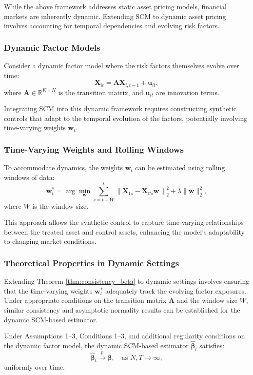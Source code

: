 While the above framework addresses static asset pricing models, financial markets are inherently dynamic. Extending SCM to dynamic asset pricing involves accounting for temporal dependencies and evolving risk factors.

\subsubsection{Dynamic Factor Models}

Consider a dynamic factor model where the risk factors themselves evolve over time:
\[
\mathbf{X}_{it} = \mathbf{A} \mathbf{X}_{i,t-1} + \mathbf{u}_{it},
\]
where $\mathbf{A} \in \mathbb{R}^{K \times K}$ is the transition matrix, and $\mathbf{u}_{it}$ are innovation terms.

Integrating SCM into this dynamic framework requires constructing synthetic controls that adapt to the temporal evolution of the factors, potentially involving time-varying weights $\mathbf{w}_t$.

\subsubsection{Time-Varying Weights and Rolling Windows}

To accommodate dynamics, the weights $\mathbf{w}_t$ can be estimated using rolling windows of data:
\[
\mathbf{w}_t^* = \arg\min_{\mathbf{w}} \sum_{s = t - W}^{t} \left\| \mathbf{X}_{1s} - \mathbf{X}_{\mathcal{C}s} \mathbf{w} \right\|_2^2 + \lambda \|\mathbf{w}\|_2^2,
\]
where $W$ is the window size.

This approach allows the synthetic control to capture time-varying relationships between the treated asset and control assets, enhancing the model's adaptability to changing market conditions.

\subsubsection{Theoretical Properties in Dynamic Settings}

Extending Theorem \ref{thm:consistency_beta} to dynamic settings involves ensuring that the time-varying weights $\mathbf{w}_t^*$ adequately track the evolving factor exposures. Under appropriate conditions on the transition matrix $\mathbf{A}$ and the window size $W$, similar consistency and asymptotic normality results can be established for the dynamic SCM-based estimator.

\begin{theorem}
\label{thm:consistency_dynamic}
Under Assumptions 1--3, Conditions 1--3, and additional regularity conditions on the dynamic factor model, the dynamic SCM-based estimator $\hat{\boldsymbol{\beta}}_t$ satisfies:
\[
\hat{\boldsymbol{\beta}}_t \xrightarrow{p} \boldsymbol{\beta}, \quad \text{as } N, T \rightarrow \infty,
\]
uniformly over time.
\end{theorem}

